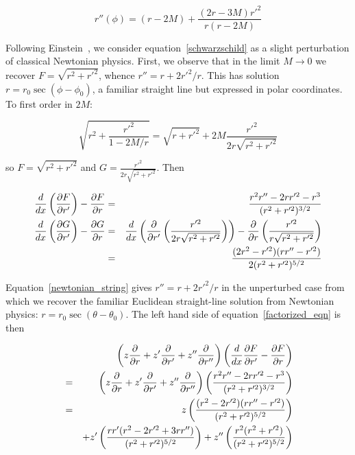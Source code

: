 \documentclass[pdflatex,sn-mathphys-num]{sn-jnl}%
\theoremstyle{thmstyleone}%
\theoremstyle{thmstyletwo}%
\theoremstyle{thmstylethree}%
\begin{document}
\begin{equation}\label{eulerstring}
  r''(\phi) = (r-2M) + \frac{(2r-3M)r'^2}{r(r-2M)}
\end{equation}


Following Einstein~\cite{einstein1915}, we consider
equation~\ref{schwarzschild} as a slight perturbation of classical
Newtonian physics.  First, we observe that in the limit
$M\longrightarrow 0$ we recover $F=\sqrt{r^2+r'^2}$, whence $r'' = r +
2r'^2/r$.  This has solution $r=r_0\sec(\phi-\phi_0)$, a familiar
straight line but expressed in polar coordinates.  To first order in
$2M$:

\begin{equation}
\sqrt{r^2 + \frac{r'^2}{1-2M/r}}=\sqrt{r+r'^2} + 2M\frac{r'^2}{2r\sqrt{r^2 + r'^2}}
\end{equation}
  
so $F=\sqrt{r^2+r'^2}$ and $G=\frac{r'^2}{2r\sqrt{r^2+r'^2}}$.  Then

\begin{eqnarray}\label{newtonian_string}
\frac{d}{dx}\left(\frac{\partial{F}}{\partial{r'}}\right) -\frac{\partial{F}}{\partial{r}} &=& \frac{r^2r''- 2rr'^2 -r^3}{(r^2 +r'^2)^{3/2}}\nonumber\\
\frac{d}{dx}\left(\frac{\partial{G}}{\partial{r'}}\right) -\frac{\partial{G}}{\partial{r}} &=&
\frac{d}{dx}\left(\frac{\partial}{\partial r'}\left(\frac{r'^2}{2r\sqrt{r^2+r'^2}}\right)\right)
- \frac{\partial}{\partial
  r}\left(\frac{r'^2}{r\sqrt{r^2+r'^2}}\right)\nonumber\\
&=& \frac{(2r^2-r'^2)(rr''-r'^2)}{2(r^2+r'^2)^{5/2}}
\end{eqnarray}

Equation~\ref{newtonian_string} gives $r'' = r + 2r'^2/r$ in the
unperturbed case from which we recover the familiar Euclidean
straight-line solution from Newtonian physics:
$r=r_0\sec(\theta-\theta_0)$.  The left hand side of
equation~\ref{factorized_eqn} is then

\begin{eqnarray}
&{}& \left(z\frac{\partial{}}{\partial{r}} + z'\frac{\partial{}}{\partial{r'}} + z''\frac{\partial{}}{\partial{r''}}\right)
\left(\frac{d}{dx}\frac{\partial{F}}{\partial{r'}}
-\frac{\partial{F}}{\partial{r}}\right)\nonumber\\
&=&  \left(z\frac{\partial{}}{\partial{r}} + z'\frac{\partial{}}{\partial{r'}} + z''\frac{\partial{}}{\partial{r''}}\right)
\left(\frac{r^2r''- 2rr'^2 -r^3}{(r^2 +r'^2)^{3/2}}\right)\nonumber\\
&=& 
 z  \left(\frac{(r^2 - 2r'^2)(rr''-r'^2)}{(r^2 + r'^2)^{5/2}}\right)\nonumber\\
 &{}& + z' \left(\frac{rr'(r^2 - 2r'^2 + 3rr'')}{(r^2 + r'^2)^{5/2}}\right)
      + z''\left(\frac{r^2    (r^2+r'^2)       }{(r^2 + r'^2)^{5/2}}\right)
\end{eqnarray}
\end{document}
